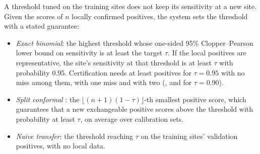  A threshold tuned on the training sites does not keep its sensitivity at a new site. Given the scores of $n$ locally confirmed positives, the system sets the threshold with a stated guarantee:
\begin{itemize}\itemsep1pt
\item \emph{Exact binomial}: the highest threshold whose one-sided 95\% Clopper--Pearson lower bound \cite{clopper1934} on sensitivity is at least the target $\tau$. If the local positives are representative, the site's sensitivity at that threshold is at least $\tau$ with probability 0.95. Certification needs at least \NCertNNinefiveZero{} positives for $\tau=0.95$ with no miss among them, \NCertNNinefiveOne{} with one miss and \NCertNNinefiveTwo{} with two (\NCertNNinezeroZero, \NCertNNinezeroOne{} and \NCertNNinezeroTwo{} for $\tau=0.90$).
\item \emph{Split conformal} \cite{vovk2005,angelopoulos2023}: the $\lfloor (n+1)(1-\tau)\rfloor$-th smallest positive score, which guarantees that a new exchangeable positive scores above the threshold with probability at least $\tau$, on average over calibration sets.
\item \emph{Naive transfer}: the threshold reaching $\tau$ on the training sites' validation positives, with no local data.
\end{itemize}
